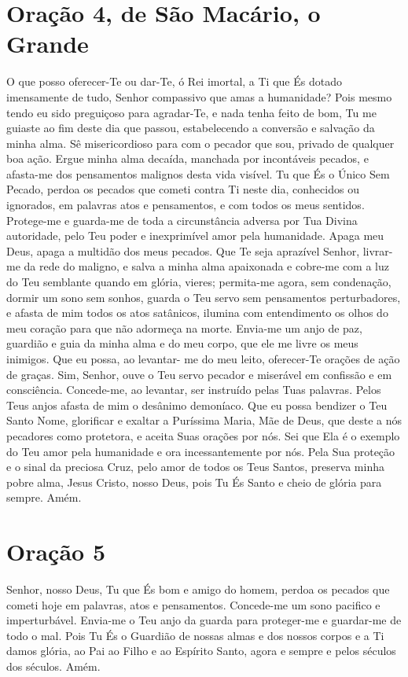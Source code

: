 \documentclass{subfiles}
\begin{document}
\section*{Oração 4, de São Macário, o Grande}
 
O que posso oferecer-Te ou dar-Te, ó Rei imortal, a Ti que És dotado 
imensamente de tudo, Senhor compassivo que amas a humanidade? Pois 
mesmo tendo eu sido preguiçoso para agradar-Te, e nada tenha feito de bom, 
Tu me guiaste ao fim deste dia que passou, estabelecendo a conversão e 
salvação da minha alma. Sê misericordioso para com o pecador que sou, 
privado de qualquer boa ação. Ergue minha alma decaída, manchada por 
incontáveis pecados, e afasta-me dos pensamentos malignos desta vida visível. 
Tu que És o Único Sem Pecado, perdoa os pecados que cometi contra Ti neste 
dia, conhecidos ou ignorados, em palavras atos e pensamentos, e com todos 
os meus sentidos. Protege-me e guarda-me de toda a circunstância adversa 
por Tua Divina autoridade, pelo Teu poder e inexprimível amor pela 
humanidade. Apaga meu Deus, apaga a multidão dos meus pecados. Que Te 
seja aprazível Senhor, livrar-me da rede do maligno, e salva a minha alma 
apaixonada e cobre-me com a luz do Teu semblante quando em glória, vieres; 
permita-me agora, sem condenação, dormir um sono sem sonhos, guarda o 
Teu servo sem pensamentos perturbadores, e afasta de mim todos os atos 
satânicos, ilumina com entendimento os olhos do meu coração para que não 
adormeça na morte. Envia-me um anjo de paz, guardião e guia da minha alma 
e do meu corpo, que ele me livre os meus inimigos. Que eu possa, ao levantar-
me do meu leito, oferecer-Te orações de ação de graças. Sim, Senhor, ouve o 
Teu servo pecador e miserável em confissão e em consciência. Concede-me, 
ao levantar, ser instruído pelas Tuas palavras. Pelos Teus anjos afasta de mim 
o desânimo demoníaco. Que eu possa bendizer o Teu Santo Nome, glorificar e 
exaltar a Puríssima Maria, Mãe de Deus, que deste a nós pecadores como 
protetora, e aceita Suas orações por nós. Sei que Ela é o exemplo do Teu amor 
pela humanidade e ora incessantemente por nós. Pela Sua proteção e o sinal 
da preciosa Cruz, pelo amor de todos os Teus Santos, preserva minha pobre 
alma, Jesus Cristo, nosso Deus, pois Tu És Santo e cheio de glória para sempre.
Amém.

\section*{Oração 5}

Senhor, nosso Deus, Tu que És bom e amigo do homem, perdoa os pecados que cometi
hoje em palavras, atos e pensamentos. Concede-me um sono pacifico e
imperturbável. Envia-me o Teu anjo da guarda para proteger-me e guardar-me de
todo o mal. Pois Tu És o Guardião de nossas almas e dos nossos corpos e a Ti
damos glória, ao Pai ao Filho e ao Espírito Santo, agora e sempre e pelos
séculos dos séculos. Amém. 
\end{document}
